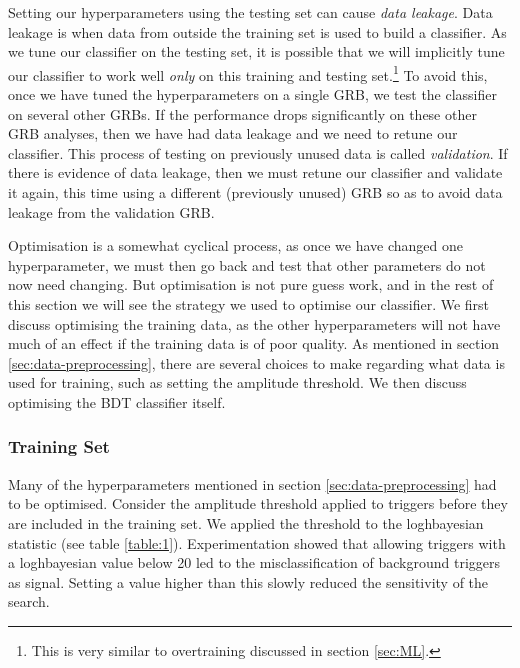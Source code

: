 \documentclass[11pt]{cuthesis}
\begin{document}
Setting our hyperparameters using the testing set can cause \textit{data leakage}. Data leakage is when data from outside the training set is used to build a classifier. As we tune our classifier on the testing set, it is possible that we will implicitly tune our classifier to work well \textit{only} on this training and testing set.\footnote{This is very similar to overtraining discussed in section \ref{sec:ML}.} To avoid this, once we have tuned the hyperparameters on a single GRB, we test the classifier on several other GRBs. If the performance drops significantly on these other GRB analyses, then we have had data leakage and we need to retune our classifier. This process of testing on previously unused data is called \textit{validation}. If there is evidence of data leakage, then we must retune our classifier and validate it again, this time using a different (previously unused) GRB so as to avoid data leakage from the validation GRB. 

Optimisation is a somewhat cyclical process, as once we have changed one hyperparameter, we must then go back and test that other parameters do not now need changing. But optimisation is not pure guess work, and in the rest of this section we will see the strategy we used to optimise our classifier. We first discuss optimising the training data, as the other hyperparameters will not have much of an effect if the training data is of poor quality. As mentioned in section \ref{sec:data-preprocessing}, there are several choices to make regarding what data is used for training, such as setting the amplitude threshold. We then discuss optimising the BDT classifier itself. 

\subsubsection{Training Set}
Many of the hyperparameters mentioned in section \ref{sec:data-preprocessing} had to be optimised. Consider the amplitude threshold applied to triggers before they are included in the training set. We applied the threshold to the loghbayesian statistic (see table \ref{table:1}). Experimentation showed that allowing triggers with a loghbayesian value below 20 led to the misclassification of background triggers as signal. Setting a value higher than this slowly reduced the sensitivity of the search.   
\end{document}
